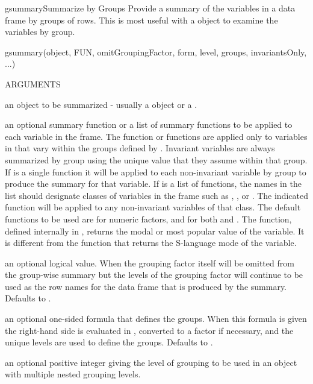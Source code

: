 \documentclass[pdftex]{article} \usepackage{url,graphicx}
\begin{document}
\begin{Helpfile}{gsummary}{Summarize by Groups}
Provide a summary of the variables in a data frame by groups of rows.
This is most useful with a  object to examine the
variables by group.
\begin{Example}
gsummary(object, FUN, omitGroupingFactor, form, level,
   groups, invariantsOnly, ...)
\end{Example}
\begin{Argument}{ARGUMENTS}
\item[\Co{object:}]
an object to be summarized - usually a 
object or a .
\item[\Co{FUN:}]
an optional summary function or a list of summary functions
to be applied to each variable in the frame.  The function or
functions are applied only to variables in  that vary
within the groups defined by .  Invariant variables are
always summarized by group using the unique value that they assume
within that group.  If  is a single
function it will be applied to each non-invariant variable by group
to produce the summary for that variable.  If  is a list of
functions, the names in the list should designate classes of
variables in the frame such as , , or
.  The indicated function will be applied to any
non-invariant variables of that class.  The default functions to be
used are  for numeric factors, and  for both
 and .  The  function, defined
internally in , returns the modal or most popular
value of the variable.  It is different from the  function
that returns the S-language mode of the variable.
\item[\Co{omitGroupingFactor:}]
an optional logical value.  When 
the grouping factor itself will be omitted from the group-wise
summary but the levels of the grouping factor will continue to be
used as the row names for the data frame that is produced by the
summary. Defaults to .
\item[\Co{form:}]
an optional one-sided formula that defines the groups.
When this formula is given the right-hand side is evaluated in
, converted to a factor if necessary, and the unique
levels are used to define the groups.  Defaults to
.
\item[\Co{level:}]
an optional positive integer giving the level of grouping
to be used in an object with multiple nested grouping levels.

\end{Argument}
\end{Helpfile}
\end{document}
